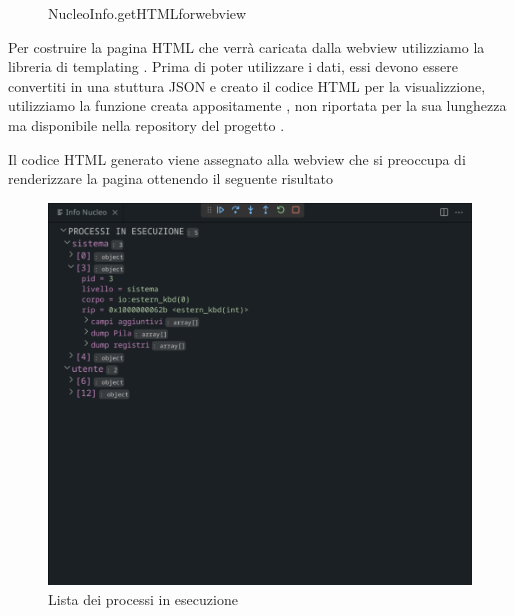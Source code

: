 \begin{figure}[H]
    
    \caption{NucleoInfo.\textunderscore getHTMLforwebview}
\end{figure}

Per costruire la pagina HTML che verrà caricata dalla webview utilizziamo la libreria di templating . Prima di poter utilizzare i dati, essi devono essere convertiti in una stuttura JSON e creato il codice HTML per la visualizzione, utilizziamo la funzione creata appositamente , non riportata per la sua lunghezza ma disponibile nella repository del progetto \cite{formatProcessList}. 

Il codice HTML generato viene assegnato alla webview che si preoccupa di renderizzare la pagina ottenendo il seguente risultato
 
\begin{figure}[H]    
    \centering
    \includegraphics[width=0.7\columnwidth]{images/processes.png}
    \caption{Lista dei processi in esecuzione}
\end{figure}